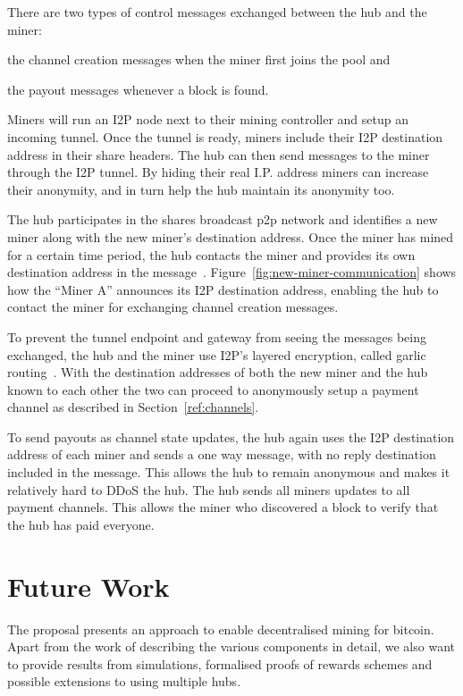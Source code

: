 \documentclass{article}
\begin{document}
There are two types of control messages exchanged between the hub and
the miner: 
\begin{enumerate*}
\item the channel creation messages when the miner first joins the
  pool and
\item the payout messages whenever a block is found.
\end{enumerate*}

Miners will run an I2P node next to their mining controller and setup
an incoming tunnel. Once the tunnel is ready, miners include their I2P
destination address in their share headers. The hub can then send
messages to the miner through the I2P tunnel. By hiding their real
I.P. address miners can increase their anonymity, and in turn help the
hub maintain its anonymity too.

The hub participates in the shares broadcast p2p network and
identifies a new miner along with the new miner's destination
address. Once the miner has mined for a certain time period, the hub
contacts the miner and provides its own destination address in the
message~\cite{i2p-streaming-library}. Figure~\ref{fig:new-miner-communication}
shows how the ``Miner A'' announces its I2P destination address,
enabling the hub to contact the miner for exchanging channel creation
messages.

To prevent the tunnel endpoint and gateway from seeing the messages
being exchanged, the hub and the miner use I2P's layered encryption,
called garlic routing~\cite{i2p-garlic-routing}. With the destination
addresses of both the new miner and the hub known to each other the
two can proceed to anonymously setup a payment channel as described in
Section~\ref{ref:channels}.

To send payouts as channel state updates, the hub again uses the I2P
destination address of each miner and sends a one way message, with no
reply destination included in the message. This allows the hub to
remain anonymous and makes it relatively hard to DDoS the hub. The hub
sends all miners updates to all payment channels. This allows the miner
who discovered a block to verify that the hub has paid everyone.

\section{Future Work}

The proposal presents an approach to enable decentralised mining for
bitcoin. Apart from the work of describing the various components in
detail, we also want to provide results from simulations, formalised
proofs of rewards schemes and possible extensions to using multiple
hubs.
\end{document}
